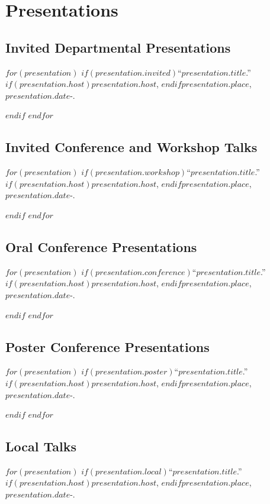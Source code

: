 \documentclass[11pt]{article}
\def\printdate#1{\xprintdate#1-}
\def\xprintdate#1-#2-#3-{#1}
\begin{document}
\section{Presentations}

\subsection{Invited Departmental Presentations}

$for(presentation)$
$if(presentation.invited)$\ind ``$presentation.title$.'' $if(presentation.host)$$presentation.host$, $endif$$presentation.place$, \printdate{$presentation.date$}.

$endif$
$endfor$

\subsection{Invited Conference and Workshop Talks}

$for(presentation)$
$if(presentation.workshop)$\ind ``$presentation.title$.'' $if(presentation.host)$\emph{$presentation.host$}, $endif$$presentation.place$, \printdate{$presentation.date$}.

$endif$
$endfor$

\subsection{Oral Conference Presentations}

$for(presentation)$
$if(presentation.conference)$\ind ``$presentation.title$.'' $if(presentation.host)$\emph{$presentation.host$}, $endif$$presentation.place$, \printdate{$presentation.date$}.

$endif$
$endfor$

\subsection{Poster Conference Presentations}

$for(presentation)$
$if(presentation.poster)$\ind ``$presentation.title$.'' $if(presentation.host)$\emph{$presentation.host$}, $endif$$presentation.place$, \printdate{$presentation.date$}.

$endif$
$endfor$

\subsection{Local Talks}

$for(presentation)$
$if(presentation.local)$\ind ``$presentation.title$.'' $if(presentation.host)$\emph{$presentation.host$}, $endif$$presentation.place$, \printdate{$presentation.date$}.
\end{document}

